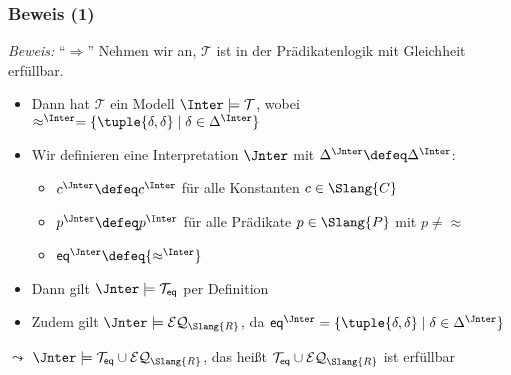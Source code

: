 \documentclass[aspectratio=1610,onlymath]{beamer}
\begin{document}
\begin{frame}[t]\frametitle{Beweis (1)}


\emph{Beweis:} "`$\Rightarrow$"' Nehmen wir an, $\mathcal{T}$ ist in der Prädikatenlogik mit Gleichheit erfüllbar.\pause
\begin{itemize}
\item Dann hat $\mathcal{T}$ ein Modell $\Inter\models\mathcal{T}$, wobei $\approx^\Inter=\{\tuple{\delta,\delta}\mid \delta\in\Delta^\Inter\}$\pause
\item Wir definieren eine Interpretation $\Jnter$ mit $\Delta^\Jnter\defeq\Delta^\Inter$:
	\begin{itemize}
	\item $c^\Jnter\defeq c^\Inter$ für alle Konstanten $c\in\Slang{C}$
	\item $p^\Jnter\defeq p^\Inter$ für alle Prädikate $p\in\Slang{P}$ mit $p\neq{\approx}$
	\item $\eqpred^\Jnter\defeq {\approx^\Inter}$
	\end{itemize}\pause
\item Dann gilt $\Jnter\models\mathcal{T}_{\eqpred}$ per Definition\pause
\item Zudem gilt $\Jnter\models\mathcal{EQ}_{\Slang{R}}$, da $\eqpred^\Jnter=\{\tuple{\delta,\delta}\mid \delta\in\Delta^\Jnter\}$\pause
\end{itemize}
$\leadsto$ $\Jnter\models\mathcal{T}_{\eqpred}\cup\mathcal{EQ}_{\Slang{R}}$, das heißt $\mathcal{T}_{\eqpred}\cup\mathcal{EQ}_{\Slang{R}}$ ist erfüllbar
\end{frame}
\end{document}
